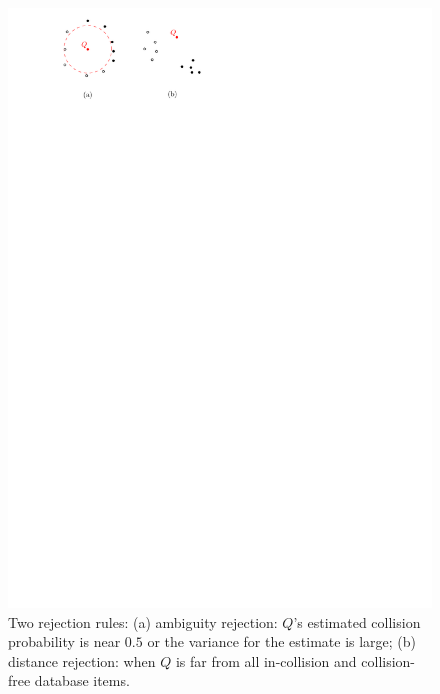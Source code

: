 \begin{figure}[H]
  \centering
  \includegraphics[width=0.45\linewidth]{figs/3/reject.pdf}
  \caption[Two rejection rules used in instance-based learning]{Two rejection rules: (a) ambiguity rejection: $Q$'s estimated collision probability is near $0.5$ or the variance for the estimate is large; (b) distance rejection: when $Q$ is far from all in-collision and collision-free database items.}
  \label{fig:3:reject}
\end{figure}


